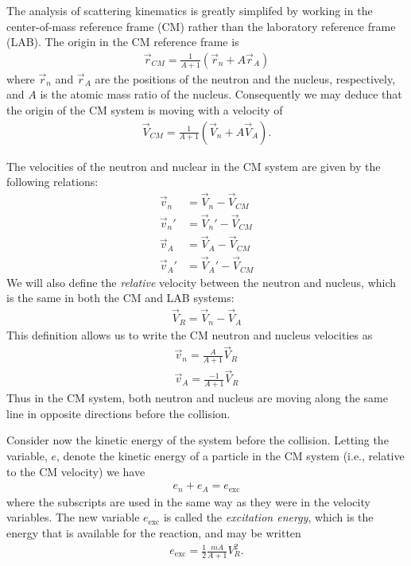 \documentclass[11pt]{article}
\begin{document}
The analysis of scattering kinematics is greatly simplifed by working in the center-of-mass reference frame (CM) rather than the laboratory reference frame (LAB).  The origin in the CM reference frame is 
\begin{align*}
  \vec{r}_{CM} = \frac{1}{A+1} \left( \vec{r}_n + A\vec{r}_A \right)
\end{align*}
where \(\vec{r}_n\) and \(\vec{r}_A\) are the positions of the neutron and the nucleus, respectively, and \(A\) is the atomic mass ratio of the nucleus.  Consequently we may deduce that the origin of the CM system is moving with a velocity of
\begin{align*}
  \vec{V}_{CM} = \frac{1}{A+1} \left(\vec{V}_n + A\vec{V}_A \right).
\end{align*}

The velocities of the neutron and nuclear in the CM system are given by the following relations:
\begin{subequations}
\begin{align*}
  \vec{v}_n  &= \vec{V}_n - \vec{V}_{CM} \\
  \vec{v}_n' &= \vec{V}_n' - \vec{V}_{CM} \\ 
  \vec{v}_A  &= \vec{V}_A - \vec{V}_{CM} \\
  \vec{v}_A' &= \vec{V}_A' - \vec{V}_{CM}
\end{align*}
\label{eq:cmDefs}
\end{subequations}
We will also define the \emph{relative} velocity between the neutron and nucleus, which is the same in both the CM and LAB systems:
\begin{align*}
  \vec{V}_R = \vec{V}_n - \vec{V}_A
\end{align*}
This definition allows us to write the CM neutron and nucleus velocities as
\begin{subequations}
\begin{align}
  \vec{v}_n = \frac{A}{A+1}\vec{V}_R \\
  \vec{v}_A = \frac{-1}{A+1}\vec{V}_R
\end{align}
\label{eq:cmVelRel}
\end{subequations}
Thus in the CM system, both neutron and nucleus are moving along the same line in opposite directions before the collision.

Consider now the kinetic energy of the system before the collision.  Letting the variable, \(e\), denote the kinetic energy of a particle in the CM system (i.e., relative to the CM velocity) we  have
\begin{align*}
  e_n + e_A = e_{\text{exc}}
\end{align*}
where the subscripts are used in the same way as they were in the velocity variables.  The new variable \(e_{\text{exc}}\) is called the \emph{excitation energy}, which is the energy that is available for the reaction, and may be written
\begin{align*}
  e_{\text{exc}} = \frac{1}{2} \frac{mA}{A+1}V_R^2.
\end{align*}
\end{document}

